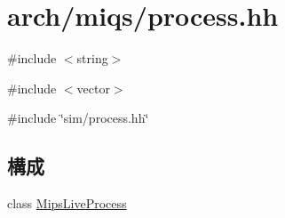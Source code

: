 \hypertarget{arch_2miqs_2process_8hh}{
\section{arch/miqs/process.hh}
\label{arch_2miqs_2process_8hh}
}
{\ttfamily \#include $<$string$>$}\par
{\ttfamily \#include $<$vector$>$}\par
{\ttfamily \#include \char`\"{}sim/process.hh\char`\"{}}\par
\subsection*{構成}
\begin{DoxyCompactItemize}
\item 
class \hyperlink{classMipsLiveProcess}{MipsLiveProcess}
\end{DoxyCompactItemize}
